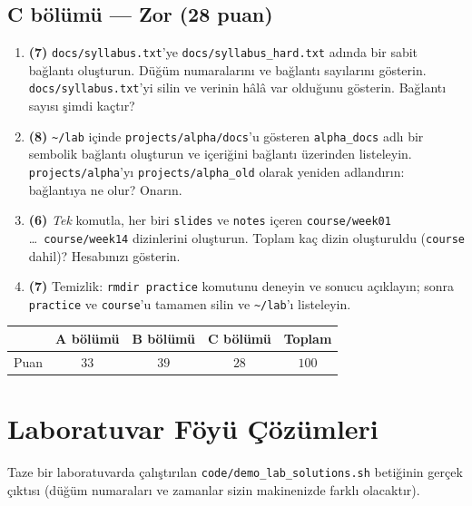 \documentclass[11pt,a4paper]{article}
\newcommand{\cmd}[1]{\texttt{#1}}
\begin{document}
\subsection*{C bölümü --- Zor (28 puan)}
\begin{enumerate}[leftmargin=2.2em,label=\textbf{\arabic*.},start=14]
  \item \textbf{(7)} \texttt{docs/syllabus.txt}'ye \texttt{docs/syllabus\_hard.txt} adında bir sabit bağlantı oluşturun. Düğüm numaralarını ve bağlantı sayılarını gösterin. \texttt{docs/syllabus.txt}'yi silin ve verinin hâlâ var olduğunu gösterin. Bağlantı sayısı şimdi kaçtır?
  \item \textbf{(8)} \texttt{\textasciitilde/lab} içinde \texttt{projects/alpha/docs}'u gösteren \texttt{alpha\_docs} adlı bir sembolik bağlantı oluşturun ve içeriğini bağlantı üzerinden listeleyin. \texttt{projects/alpha}'yı \texttt{projects/alpha\_old} olarak yeniden adlandırın: bağlantıya ne olur? Onarın.
  \item \textbf{(6)} \emph{Tek} komutla, her biri \texttt{slides} ve \texttt{notes} içeren \texttt{course/week01} \dots\ \texttt{course/week14} dizinlerini oluşturun. Toplam kaç dizin oluşturuldu (\texttt{course} dahil)? Hesabınızı gösterin.
  \item \textbf{(7)} Temizlik: \cmd{rmdir practice} komutunu deneyin ve sonucu açıklayın; sonra \texttt{practice} ve \texttt{course}'u tamamen silin ve \texttt{\textasciitilde/lab}'ı listeleyin.
\end{enumerate}

\begin{center}
\renewcommand{\arraystretch}{1.15}
\begin{tabular}{@{}lccc|c@{}}
\toprule
 & \textbf{A bölümü} & \textbf{B bölümü} & \textbf{C bölümü} & \textbf{Toplam} \\
\midrule
Puan & $33$ & $39$ & $28$ & $100$ \\
\bottomrule
\end{tabular}
\end{center}

\section{Laboratuvar Föyü Çözümleri}

Taze bir laboratuvarda çalıştırılan \cmd{code/demo\_lab\_solutions.sh} betiğinin gerçek çıktısı (düğüm numaraları ve zamanlar sizin makinenizde farklı olacaktır).
\end{document}
